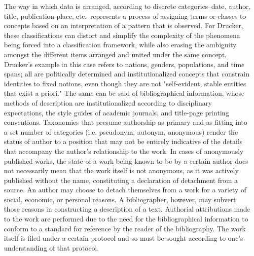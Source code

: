 The way in which data is arranged, according to discrete categories--date, author, title, publication place, etc.--represents a process of assigning terms or classes to concepts based on an interpretation of a pattern that is observed. For Drucker, these classifications can distort and simplify the complexity of the phenomena being forced into a classification framework, while also erasing the ambiguity amongst the different items arranged and united under the same concept. Drucker's example in this case refers to nations, genders, populations, and time spans; all are politically determined and institutionalized concepts that constrain identities to fixed notions, even though they are not "self-evident, stable entities that exist a priori."\autocite[129]{drucker_graphesis_2014} The same can be said of bibliographical information, whose methods of description are institutionalized according to disciplinary expectations, the style guides of academic journals, and title-page printing conventions. Taxonomies that presume authorship as primary and as fitting into a set number of categories (i.e. pseudonym, autonym, anonymous) render the status of author to a position that may not be entirely indicative of the details that accompany the author's relationship to the work. In cases of anonymously published works, the state of a work being known to be by a certain author does not necessarily mean that the work itself is not anonymous, as it was actively published without the name, constituting a declaration of detachment from a source. An author may choose to detach themselves from a work for a variety of social, economic, or personal reasons. A bibliographer, however, may subvert those reasons in constructing a description of a text. Authorial attributions made to the work are performed due to the need for the bibliographical information to conform to a standard for reference by the reader of the bibliography. The work itself is filed under a certain protocol and so must be sought according to one's understanding of that protocol. 

